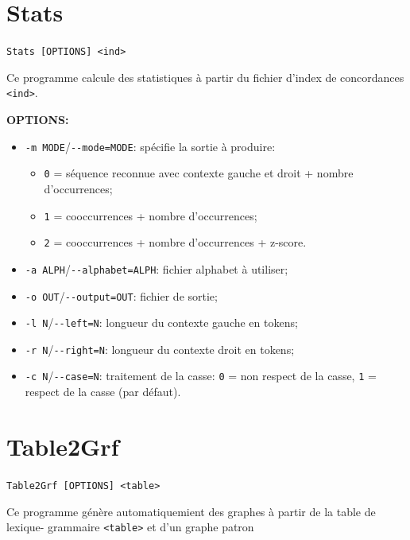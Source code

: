 \section{Stats}

\verb+Stats [OPTIONS] <ind>+

\bigskip
\noindent Ce programme calcule des statistiques à partir du fichier d'index de concordances \verb+<ind>+.

\bigskip
\noindent \textbf{OPTIONS:}
\begin{itemize}
\item \verb+-m MODE+/\verb+--mode=MODE+: spécifie la sortie à produire:
  \begin{itemize}
  \item \verb+0+ = séquence reconnue avec contexte gauche et droit + nombre d'occurrences;
  \item \verb+1+ = cooccurrences + nombre d'occurrences;
      \item \verb+2+ = cooccurrences + nombre d'occurrences + z-score.
  \end{itemize}

  \item \verb+-a ALPH+/\verb+--alphabet=ALPH+: fichier alphabet à utiliser;

  \item \verb+-o OUT+/\verb+--output=OUT+: fichier de sortie;

  \item \verb+-l N+/\verb+--left=N+: longueur du contexte gauche en tokens;
   
  \item \verb+-r N+/\verb+--right=N+: longueur du contexte droit en tokens;
  
  \item \verb+-c N+/\verb+--case=N+: traitement de la casse: \verb+0+ = non respect de la casse,
  	  \verb+1+ = respect de la casse (par défaut).
\end{itemize}







\section{Table2Grf}
\verb+Table2Grf [OPTIONS] <table>+

\bigskip
\noindent {}
Ce programme génère automatiquemient des graphes à partir de la table de lexique-
grammaire \verb+<table>+ et d'un graphe patron

